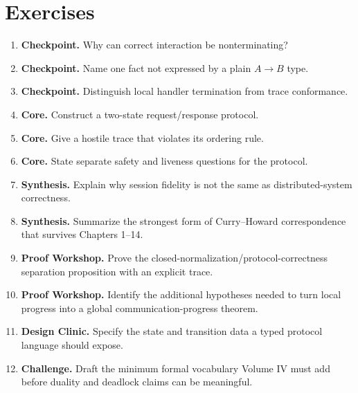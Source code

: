 \section*{Exercises}
\begin{enumerate}[label=\textbf{14.\arabic*.}]
\item \textbf{Checkpoint.} Why can correct interaction be nonterminating?
\item \textbf{Checkpoint.} Name one fact not expressed by a plain $A\to B$ type.
\item \textbf{Checkpoint.} Distinguish local handler termination from trace conformance.
\item \textbf{Core.} Construct a two-state request/response protocol.
\item \textbf{Core.} Give a hostile trace that violates its ordering rule.
\item \textbf{Core.} State separate safety and liveness questions for the protocol.
\item \textbf{Synthesis.} Explain why session fidelity is not the same as distributed-system correctness.
\item \textbf{Synthesis.} Summarize the strongest form of Curry--Howard correspondence that survives Chapters 1--14.
\item \textbf{Proof Workshop.} Prove the closed-normalization/protocol-correctness separation proposition with an explicit trace.
\item \textbf{Proof Workshop.} Identify the additional hypotheses needed to turn local progress into a global communication-progress theorem.
\item \textbf{Design Clinic.} Specify the state and transition data a typed protocol language should expose.
\item \textbf{Challenge.} Draft the minimum formal vocabulary Volume IV must add before duality and deadlock claims can be meaningful.
\end{enumerate}
